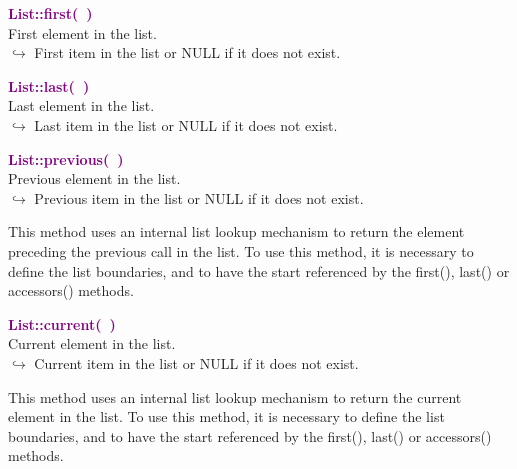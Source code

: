 \textcolor{purple}{\textbf{List::first(~)}}\label{List::first()}\\
First element in the list.\\ \hspace*{10mm}$\hookrightarrow$ First item in the list or NULL if it does not exist.


\textcolor{purple}{\textbf{List::last(~)}}\label{List::last()}\\
Last element in the list.\\ \hspace*{10mm}$\hookrightarrow$ Last item in the list or NULL if it does not exist.


\textcolor{purple}{\textbf{List::previous(~)}}\label{List::previous()}\\
Previous element in the list.\\ \hspace*{10mm}$\hookrightarrow$ Previous item in the list or NULL if it does not exist.

This method uses an internal list lookup mechanism to return the element preceding the previous call in the list.
To use this method, it is necessary to define the list boundaries, and to have the start referenced by the first(), last() or accessors() methods.

\textcolor{purple}{\textbf{List::current(~)}}\label{List::current()}\\
Current element in the list.\\ \hspace*{10mm}$\hookrightarrow$ Current item in the list or NULL if it does not exist.

This method uses an internal list lookup mechanism to return the current element in the list.
To use this method, it is necessary to define the list boundaries, and to have the start referenced by the first(), last() or accessors() methods.

